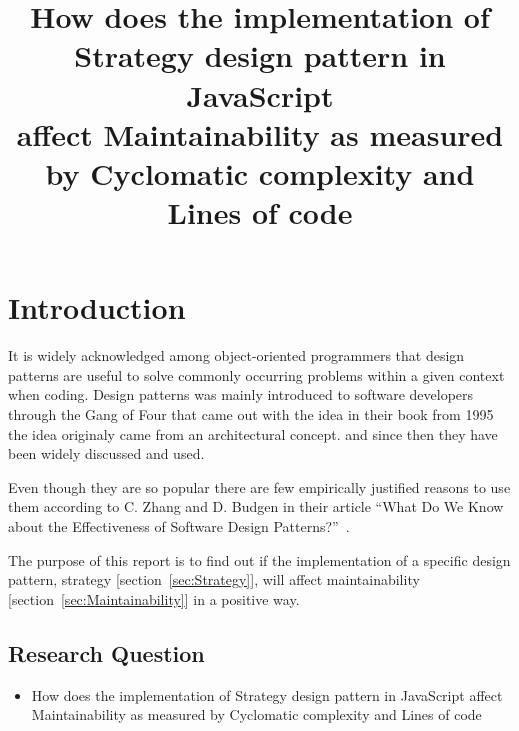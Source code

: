 \documentclass[conference, a4paper]{IEEEtran}
\begin{document}
\title{How does the implementation of\\
Strategy design pattern in JavaScript\\
affect Maintainability as measured by Cyclomatic complexity and Lines of code}
\author{
}

\maketitle

\begin{abstract}
\end{abstract}

\section{Introduction}
\label{sec:Introduction}
It is widely acknowledged among object-oriented programmers that design patterns are useful to solve commonly occurring problems within a given context when coding. Design patterns was mainly introduced to software developers through the Gang of Four that came out with the idea in their book from 1995~\cite{bibitem:GoF} the idea originaly came from an architectural concept. and since then they have been widely discussed and used.

Even though they are so popular there are few empirically justified reasons to use them according to C. Zhang and D. Budgen in their article ``What Do We Know about the Effectiveness of Software Design Patterns?''~\cite{bibitem:Zhang}.

The purpose of this report is to find out if the implementation of a specific design pattern, strategy [section~\ref{sec:Strategy}], will affect maintainability [section~\ref{sec:Maintainability}] in a positive way.

\subsection{Research Question}
\begin{itemize}
	\item How does the implementation of Strategy design pattern in JavaScript affect Maintainability as measured by Cyclomatic complexity and Lines of code
\end{itemize}
\end{document}
